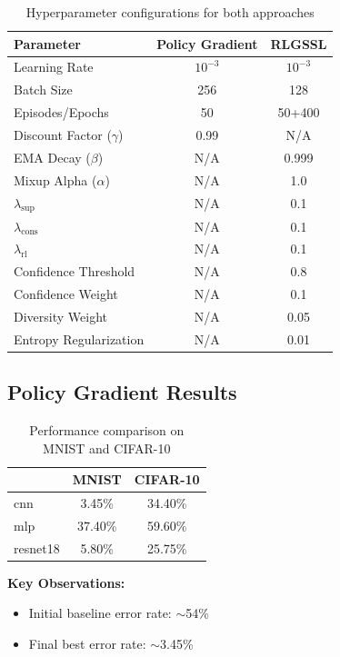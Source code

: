 \documentclass{scrartcl}
\begin{document}
\begin{table}[H]
    \centering
    \begin{tabular}{lcc}
        \hline
        \textbf{Parameter} & \textbf{Policy Gradient} & \textbf{RLGSSL} \\
        \hline
        Learning Rate & $10^{-3}$ & $10^{-3}$ \\
        Batch Size & 256 & 128 \\
        Episodes/Epochs & 50 & 50+400 \\
        Discount Factor ($\gamma$) & 0.99 & N/A \\
        EMA Decay ($\beta$) & N/A & 0.999 \\
        Mixup Alpha ($\alpha$) & N/A & 1.0 \\
        $\lambda_{\text{sup}}$ & N/A & 0.1 \\
        $\lambda_{\text{cons}}$ & N/A & 0.1 \\
        $\lambda_{\text{rl}}$ & N/A & 0.1 \\
        Confidence Threshold & N/A & 0.8 \\
        Confidence Weight & N/A & 0.1 \\
        Diversity Weight & N/A & 0.05 \\
        Entropy Regularization & N/A & 0.01 \\
        \hline
    \end{tabular}
    \caption{Hyperparameter configurations for both approaches}
    \label{tab:hyperparameters}
\end{table}

\subsection{Policy Gradient Results}
\begin{table}[h]
\centering
\begin{tabular}{lcc}
\hline
\textbf{} & \textbf{MNIST} & \textbf{CIFAR-10} \\
\hline
cnn      & 3.45\%  & 34.40\% \\
mlp      & 37.40\% & 59.60\% \\
resnet18 & 5.80\%  & 25.75\% \\
\hline
\end{tabular}
\caption{Performance comparison on MNIST and CIFAR-10}
\end{table}

\textbf{Key Observations:}
\begin{itemize}
    \item Initial baseline error rate: $\sim$54\%
    \item Final best error rate: $\sim$3.45\%
\end{itemize}
\end{document}
